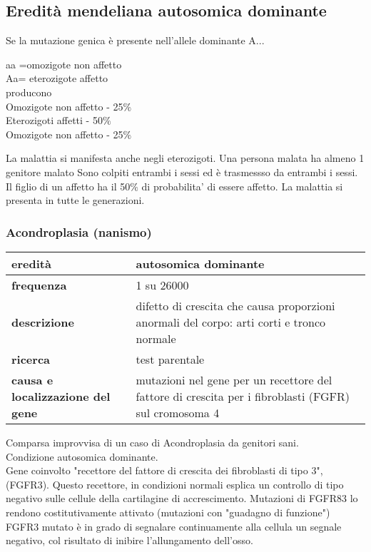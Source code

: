 \documentclass{article}
\begin{document}
\subsection{Eredità mendeliana autosomica dominante}
Se la mutazione genica è presente nell'allele dominante A...\\
\begin{center}
aa =omozigote non affetto\\Aa= eterozigote affetto\\
producono\\
Omozigote non affetto - 25$\%$\\
Eterozigoti affetti  - 50$\%$\\
Omozigote non affetto - 25$\%$ 
\end{center}
La malattia si manifesta anche negli eterozigoti. Una persona malata ha almeno 1 genitore malato
Sono colpiti entrambi i sessi ed è trasmessso da entrambi i sessi.
Il figlio di un affetto ha il 50$\%$ di probabilita' di essere affetto.
La malattia si presenta in tutte le generazioni.
\subsubsection{Acondroplasia (nanismo)}
\begin{center}
    \begin{tabular}{lp{}}
        \toprule
        \textbf{eredità} & autosomica dominante\\
        \midrule
        \textbf{frequenza} & 1 su 26000\\
        \midrule
        \textbf{descrizione} & difetto di crescita che causa proporzioni anormali del corpo: arti corti e tronco normale\\
        \midrule
        \textbf{ricerca} & test parentale\\
        \midrule
        \textbf{causa e localizzazione del gene} & mutazioni nel gene per un recettore del fattore di crescita per i fibroblasti (FGFR) sul cromosoma 4\\
        \bottomrule
    \end{tabular}
\end{center}
Comparsa improvvisa di un caso di Acondroplasia da genitori sani.\\
Condizione autosomica dominante.\\
Gene coinvolto "recettore del fattore di crescita dei fibroblasti di tipo 3", (FGFR3). Questo recettore, in condizioni
normali esplica un controllo di tipo negativo sulle cellule della cartilagine di accrescimento.
Mutazioni di FGFR83 lo rendono costitutivamente attivato (mutazioni con "guadagno di funzione")
FGFR3 mutato è in grado di segnalare continuamente alla cellula un segnale negativo, col risultato di inibire l'allungamento dell'osso.
\end{document}
